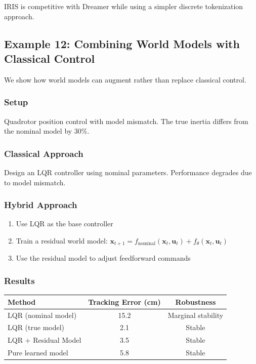 IRIS is competitive with Dreamer while using a simpler discrete tokenization approach.

\subsection{Example 12: Combining World Models with Classical Control}

We show how world models can augment rather than replace classical control.

\subsubsection{Setup}

Quadrotor position control with model mismatch. The true inertia differs from the nominal model by 30\%.

\subsubsection{Classical Approach}

Design an LQR controller using nominal parameters. Performance degrades due to model mismatch.

\subsubsection{Hybrid Approach}

\begin{enumerate}
    \item Use LQR as the base controller
    \item Train a residual world model: $\mathbf{x}_{t+1} = f_{\text{nominal}}(\mathbf{x}_t, \mathbf{u}_t) + f_\theta(\mathbf{x}_t, \mathbf{u}_t)$
    \item Use the residual model to adjust feedforward commands
\end{enumerate}

\subsubsection{Results}

\begin{center}
\begin{tabular}{lcc}
\toprule
\textbf{Method} & \textbf{Tracking Error (cm)} & \textbf{Robustness} \\
\midrule
LQR (nominal model) & 15.2 & Marginal stability \\
LQR (true model) & 2.1 & Stable \\
LQR + Residual Model & 3.5 & Stable \\
Pure learned model & 5.8 & Stable \\
\bottomrule
\end{tabular}
\end{center}

